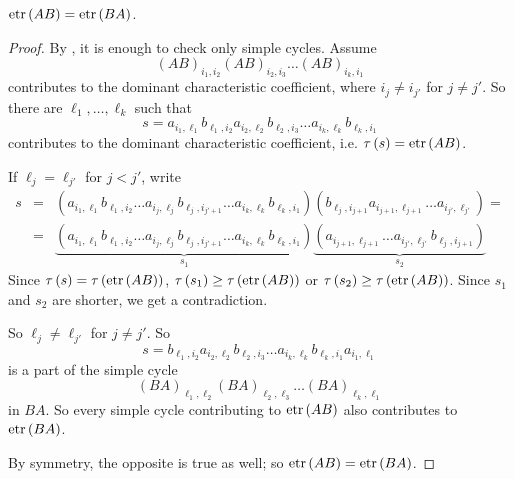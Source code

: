 \begin{lem}
$\textnormal{etr}\left(AB\right)=\textnormal{etr}\left(BA\right)$.
\end{lem}
\begin{proof}
By , it is enough to check only simple cycles. Assume
$$\left(AB\right)_{i_{1},i_{2}}\left(AB\right)_{i_{2},i_{3}}\dots\left(AB\right)_{i_{k},i_{1}}$$
contributes to the dominant characteristic coefficient, where $i_{j}\neq i_{j'}$ for $j\neq j'$. So there are $\ell_{1},\dots,\ell_{k}$ such that
$$s=a_{i_{1},\ell_{1}}b_{\ell_{1},i_{2}}a_{i_{2},\ell_{2}}b_{\ell_{2},i_{3}}\dots a_{i_{k},\ell_{k}}b_{\ell_{k},i_{1}}$$
contributes to the dominant characteristic coefficient, i.e. $\tau\left(s\right)=\textnormal{etr}\left(AB\right)$.

If $\ell_{j}=\ell_{j'}$ for $j<j'$, write
\begin{eqnarray*}
s & = & \left(a_{i_{1},\ell_{1}}b_{\ell_{1},i_{2}}\dots a_{i_{j},\ell_{j}}b_{\ell_{j},i_{j'+1}}\dots a_{i_{k},\ell_{k}}b_{\ell_{k},i_{1}}\right)\left(b_{\ell_{j},i_{j+1}}a_{i_{j+1},\ell_{j+1}}\dots a_{i_{j'},\ell_{j'}}\right)=\\
 & = & \underbrace{\left(a_{i_{1},\ell_{1}}b_{\ell_{1},i_{2}}\dots a_{i_{j},\ell_{j}}b_{\ell_{j},i_{j'+1}}\dots a_{i_{k},\ell_{k}}b_{\ell_{k},i_{1}}\right)}_{s_{1}}\underbrace{\left(a_{i_{j+1},\ell_{j+1}}\dots a_{i_{j'},\ell_{j'}}b_{\ell_{j},i_{j+1}}\right)}_{s_{2}}
\end{eqnarray*}
Since $\tau\left(s\right)=\tau\left(\textnormal{etr}\left(AB\right)\right)$, $\tau\left(s_{1}\right)\ge\tau\left(\textnormal{etr}\left(AB\right)\right)$ or $\tau\left(s_{2}\right)\ge\tau\left(\textnormal{etr}\left(AB\right)\right)$. Since $s_{1}$ and $s_{2}$ are shorter, we get a contradiction.

So $\ell_{j}\neq\ell_{j'}$ for $j\neq j'$. So
$$s=b_{\ell_{1},i_{2}}a_{i_{2},\ell_{2}}b_{\ell_{2},i_{3}}\dots a_{i_{k},\ell_{k}}b_{\ell_{k},i_{1}}a_{i_{1},\ell_{1}}$$
is a part of the simple cycle
$$\left(BA\right)_{\ell_{1},\ell_{2}}\left(BA\right)_{\ell_{2},\ell_{3}}\dots\left(BA\right)_{\ell_{k},\ell_{1}}$$
in $BA$. So every simple cycle contributing to $\textnormal{etr}\left(AB\right)$ also contributes to $\textnormal{etr}\left(BA\right)$.

By symmetry, the opposite is true as well; so $\textnormal{etr}\left(AB\right)=\textnormal{etr}\left(BA\right)$.
\end{proof}

